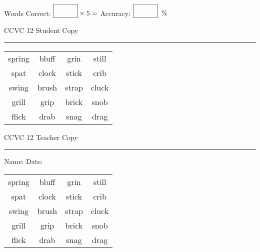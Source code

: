 \documentclass{memoir}
\begin{document}
\normalsize

Words Correct: $\fbox{\phantom{\huge 100}} \times 5 = $ Accuracy: $\fbox{\phantom{\huge 100}}\;\; \%$ 

\vfill

\newpage


\footnotesize \noindent
CCVC 12 \hfill Student Copy
\smallskip
\hrule

\Large

\setlength{\tabcolsep}{14pt}
\def\arraystretch{3}

{\selectfont


\begin{vplace}[0.5]
\begin{center}
\begin{tabular}{cccc}
spring & bluff & grin     & still \\
spat            & clock & stick & crib \\
swing & brush & strap & cluck \\
grill            & grip      & brick       & snob \\
flick            & drab             & snag & drag        \\
\end{tabular}
\end{center}
\end{vplace}

}

\newpage

\footnotesize \noindent
CCVC 12 \hfill Teacher Copy
\smallskip
\hrule

\normalsize

\vfill

\noindent
Name: \underline{\hspace{1.75in}} \hfill Date: \underline{\hspace{1in}}

\Large

{\selectfont


\begin{vplace}[0.5]
\begin{center}
\begin{tabular}{cccc}
spring & bluff & grin     & still \\
spat            & clock & stick & crib \\
swing & brush & strap & cluck \\
grill            & grip      & brick       & snob \\
flick            & drab             & snag & drag        \\
\end{tabular}
\end{center}
\end{vplace}



}
\end{document}
